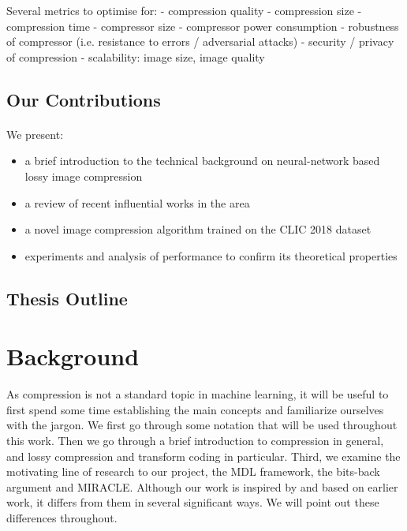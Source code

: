 \documentclass{article}
\begin{document}
Several metrics to optimise for:
- compression quality
- compression size
- compression time
- compressor size
- compressor power consumption
- robustness of compressor (i.e. resistance to errors / adversarial attacks)
- security / privacy of compression
- scalability: image size, image quality

\subsection{Our Contributions}
\paragraph{}

We present:
\begin{itemize}
\item a brief introduction to the technical background on neural-network
  based lossy image compression
\item a review of recent influential works in the area

\item a novel image compression algorithm trained on the CLIC 2018 dataset \cite{clic2018}

\item experiments and analysis of performance to confirm its theoretical properties
\end{itemize}

\subsection{Thesis Outline}
\paragraph{}



\section{Background}
\par
As compression is not a standard topic in machine learning, it will be useful to
first spend some time establishing the main concepts and familiarize ourselves
with the jargon. We first go through some notation that will be used throughout
this work. Then we go through a brief introduction to compression in general,
and lossy compression and transform coding in particular. Third, we examine the
motivating line of research to our project, the MDL framework, the bits-back
argument and MIRACLE. Although our work is inspired by and based on earlier
work, it differs from them in several significant ways. We will point out these
differences throughout.
\end{document}
